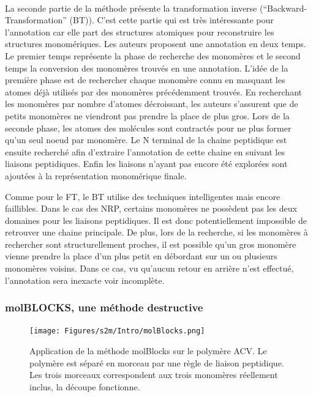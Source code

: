 \documentclass[12pt,french,twoside]{report}
\begin{document}
\paragraph{}La seconde partie de la méthode présente la transformation inverse (``Backward-Transformation'' (BT)).
C'est cette partie qui est très intéressante pour l'annotation car elle part des structures atomiques pour reconstruire les structures monomériques.
Les auteurs proposent une annotation en deux temps.
Le premier temps représente la phase de recherche des monomères et le second temps la conversion des monomères trouvés en une annotation.
L'idée de la première phase est de rechercher chaque monomère connu en masquant les atomes déjà utilisés par des monomères précédemment trouvés.
En recherchant les monomères par nombre d'atomes décroissant, les auteurs s'assurent que de petits monomères ne viendront pas prendre la place de plus gros.
Lors de la seconde phase, les atomes des molécules sont contractés pour ne plus former qu'un seul noeud par monomère.
Le N terminal de la chaine peptidique est ensuite recherché afin d'extraire l'annotation de cette chaine en suivant les liaisons peptidiques.
Enfin les liaisons n'ayant pas encore été explorées sont ajoutées à la représentation monomérique finale.

Comme pour le FT, le BT utilise des techniques intelligentes mais encore faillibles.
Dans le cas des NRP, certains monomères ne possèdent pas les deux domaines pour les liaisons peptidiques.
Il est donc potentiellement impossible de retrouver une chaine principale.
De plus, lors de la recherche, si les monomères à rechercher sont structurellement proches, il est possible qu'un gros monomère vienne prendre la place d'un plus petit en débordant sur un ou plusieurs monomères voisins.
Dans ce cas, vu qu'aucun retour en arrière n'est effectué, l'annotation sera inexacte voir incomplète.


\subsubsection{molBLOCKS, une méthode destructive}

\begin{figure}[!h]
  \begin{center}
    \texttt{[image: Figures/s2m/Intro/molBlocks.png]}
    \caption{\label{molBlocks}Application de la méthode molBlocks sur le polymère ACV.
    Le polymère est séparé en morceau par une règle de liaison peptidique.
    Les trois morceaux correspondent aux trois monomères réellement inclus, la découpe fonctionne.}
  \end{center}
\end{figure}
\end{document}
